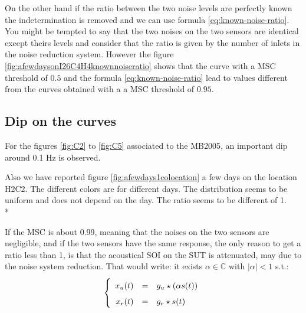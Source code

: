 On the other hand if the ratio between the two noise levels are perfectly known the indetermination is removed and we can use formula \eqref{eq:known-noise-ratio}. You might be tempted to say that the two noises on the two sensors are identical except theirs levels and consider that the ratio is given by the number of inlets in the noise reduction system. However the figure \ref{fig:afewdaysonI26C4H4knownnoiseratio} shows that the curve with a MSC threshold of $0.5$ and the formula \eqref{eq:known-noise-ratio} lead to values different from the curves obtained with a a MSC threshold of $0.95$.


\newpage\clearpage
\subsection{Dip on the curves}
For the figures \ref{fig:C2} to \ref{fig:C5} associated to the MB2005, an important dip around 0.1 Hz is observed. 

Also we have reported figure \ref{fig:afewdays1colocation} a few days on the location H2C2. The different colors are for different days. The distribution seems to be uniform and does not depend on the day. The ratio seems to be different of 1.\\*

If the MSC is about 0.99, meaning that the noises on the two sensors are negligible, and if the two sensors have the same response, the only reason to get a ratio less than 1, is that the acoustical SOI on the SUT is attenuated, may due to the noise system reduction. That would write: it exists $\alpha\in\mathbb{C}$ with $|\alpha|<1$ s.t.:
\begin{eqnarray}
\label{eq:model-of-obervation}
\left\{
\renewcommand\arraystretch{1.6}
\begin{array}{rcl}
x_{\ut}(t)&=&g_{\ut}  \star (\alpha s(t))
\\
x_{\rf}(t)&=&g_{\rf}  \star s(t)
\end{array}
\right.
\end{eqnarray}



